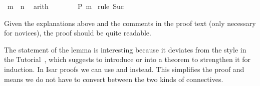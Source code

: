 \begin{isabellebody}
\ {\isachardoublequote}m\ {\isacharless}\ n{\isachardoublequote}\ \isamarkupfalse%
\ arith\isanewline
\ \ \ \ \ \ \isamarkupfalse%
\ {\isachardoublequote}P\ m{\isachardoublequote}\ \isamarkupfalse%
rule\ Suc{\isacharparenright}\isanewline
\ \ \ \ \isamarkupfalse%
\isanewline
\ \ \isamarkupfalse%
\isanewline
\isamarkupfalse%
%
\endisatagproof
{\isafoldproof}%
%
\isadelimproof
%
\endisadelimproof
\isamarkuptrue%
%
\begin{isamarkuptext}%
\noindent Given the explanations above and the comments in the
proof text (only necessary for novices), the proof should be quite
readable.

The statement of the lemma is interesting because it deviates from the style in
the Tutorial~\cite{LNCS2283}, which suggests to introduce \isa{{\isasymforall}} or
\isa{{\isasymlongrightarrow}} into a theorem to strengthen it for induction. In Isar
proofs we can use \isa{{\isasymAnd}} and \isa{{\isasymLongrightarrow}} instead. This simplifies the
proof and means we do not have to convert between the two kinds of
connectives.


\end{isamarkuptext}
\end{isabellebody}

